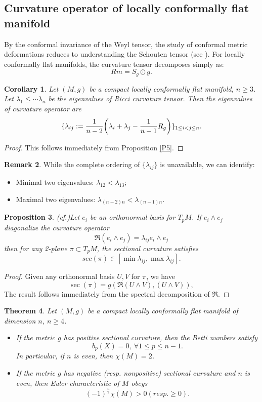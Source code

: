\documentclass[12pt, twoside]{article}
\newtheorem{theorem}{Theorem}[section]
\newtheorem{corollary}[theorem]{Corollary}
\newtheorem{proposition}[theorem]{Proposition}
\theoremstyle{definition}
\newtheorem{remark}[theorem]{Remark}
\numberwithin{equation}{section}
\def \la {\lambda}
\begin{document}
\subsection{Curvature operator of  locally conformally flat manifold }
By the conformal invariance of the Weyl tensor, the study of conformal metric deformations reduces to understanding the Schouten tensor (see \cite{GLW04,GLW05,GVW03,GW04,Gur94}). For locally conformally flat manifolds, the curvature tensor decomposes simply as:
\begin{equation*}
Rm=S_{g}\odot g.
\end{equation*}
\begin{corollary}\label{C5}
	Let $(M,g)$ be a compact locally conformally flat manifold, $n\geq3$. Let $\la_{1}\leq\cdots\la_{n}$ be the eigenvalues of Ricci curvature tensor. Then the eigenvalues of curvature operator are 
	$$\{\la_{ij}:=\frac{1}{n-2}\bigg{(}\la_{i}+\la_{j}-\frac{1}{n-1}R_{g}\bigg{)} \}_{1\leq i<j\leq n}.$$ 
\end{corollary}
\begin{proof}
This follows immediately from Proposition \ref{P5}.
\end{proof}	
\begin{remark}
	While the complete ordering of $\{\la_{ij}\}$ is unavailable, we can identify:
	\begin{itemize}
		\item Minimal two eigenvalues: $\la_{12}<\la_{13}$;
		\item Maximal two eigenvalues: $\la_{(n-2)n}<\la_{(n-1)n}$.
	\end{itemize}		
\end{remark}
\begin{proposition}(cf.\cite{Pet16})\label{P1}
	Let $e_{i}$ be an orthonormal basis for $T_{p}M$. If $e_{i}\wedge e_{j}$ diagonalize the curvature operator 
	$$\mathfrak{R}(e_{i}\wedge e_{j})=\la_{ij}e_{i}\wedge e_{j}$$
	then for any 2-plane $\pi \subset T_pM$, the sectional curvature satisfies
	$$sec(\pi)\in[\min{\la_{ij}},\max\la_{ij}].$$
\end{proposition}
\begin{proof}
	Given any orthonormal basis ${U,V}$ for $\pi$, we have 
	$$\sec(\pi)=g(\mathfrak{R}(U\wedge V),(U\wedge V)),$$
The result follows immediately from the spectral decomposition of $\mathfrak{R}$. 
\end{proof}
\begin{theorem}\label{T4}
	Let $(M,g)$ be a compact locally conformally flat manifold of dimension $n$, $n\geq4$. 
	\begin{itemize}
	\item[(1)]
	If the metric $g$ has positive sectional curvature, then the Betti numbers satisfy
 $$b_{p}(X)=0,\ \forall1\leq p\leq n-1.$$
In particular, if $n$ is even, then $\chi(M)=2$.
\item[(2)] If the metric $g$ has negative (resp. nonpositive) sectional curvature and $n$ is even, then Euler characteristic  of $M$ obeys
$$(-1)^{\frac{n}{2}}\chi(M)>0 (resp.\geq0).$$
\end{itemize} 
\end{theorem}
\end{document}

